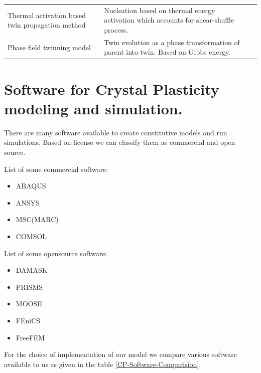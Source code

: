 \begin{table}[H]
\begin{tabular}{|m{4.2cm}|m{7.8cm}|c|}
    \cline{1-2}
    Thermal activation based twin propagation method \cite{CHENG2017512} \cite{Ghosh2018} & Nucleation based on thermal energy activation which accounts for shear-shuffle process. & \multicolumn{1}{|c|}{} \\
    \cline{1-2}
    Phase field twinning model \cite{KONDO2014672} \cite{GRILLI2020104061} & Twin evolution as a phase transformation of parent into twin. Based on Gibbs energy. & \multicolumn{1}{|c|}{} \\
    \hline
  \end{tabular}
  \label{Comparision of CP models for twinning}
\end{table}

\section{Software for Crystal Plasticity modeling and simulation.}
There are many software available to create constitutive models and run simulations. Based on license we can classify them as commercial and open source.

List of some commercial software:
\vspace{-0.8em}
\begin{itemize}
    \setlength\itemsep{-0.5em}
    \item ABAQUS
    \item ANSYS
    \item MSC(MARC)
    \item COMSOL
\end{itemize}
\vspace{-0.8em}
List of some opensource software:
\vspace{-0.8em}
\begin{itemize}
    \setlength\itemsep{-0.5em}
    \item DAMASK
    \item PRISMS
    \item MOOSE
    \item FEniCS
    \item FreeFEM
\end{itemize}

For the choice of implementation of our model we compare various software available to us as given in the table \ref{CP-Software-Comparision}.

